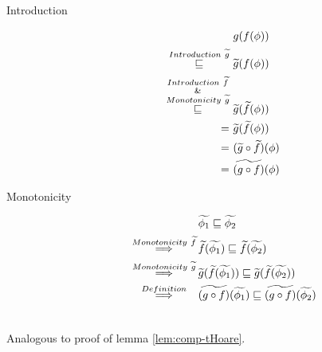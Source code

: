 \begin{proofatend}
    \begin{description}
        \item[Introduction]
        \begin{align*}
        &g(f(\phi))\\
        \overset{Introduction~\widetilde{g}}{\sqsubseteq}~
        &\widetilde{g}(f(\phi))\\
        \overset{\substack{Introduction~\widetilde{f}\\\&\\Monotonicity~\widetilde{g}}}{\sqsubseteq}~
        &\widetilde{g}(\widetilde{f}(\phi))\\
        =~
        &\widetilde{g}(\widetilde{f}(\phi))\\
        =~
        &(\widetilde{g} \circ \widetilde{f})(\phi)\\
        =~
        &\widetilde{(g \circ f)}(\phi)
        \end{align*}
        
        \item[Monotonicity]
        \begin{align*}
        &\widetilde{\phi_1} \sqsubseteq \widetilde{\phi_2}\\
        \overset{Monotonicity~\widetilde{f}}{\quad\quad\implies\quad\quad}
        &\widetilde{f}(\widetilde{\phi_1}) \sqsubseteq \widetilde{f}(\widetilde{\phi_2})\\
        \overset{Monotonicity~\widetilde{g}}{\quad\quad\implies\quad\quad}
        &\widetilde{g}(\widetilde{f}(\widetilde{\phi_1})) \sqsubseteq \widetilde{g}(\widetilde{f}(\widetilde{\phi_2}))\\
        \overset{Definition}{\quad\quad\implies\quad\quad}
        &\widetilde{(g \circ f)}(\widetilde{\phi_1}) \sqsubseteq \widetilde{(g \circ f)}(\widetilde{\phi_2})
        \end{align*}
    \end{description}
\end{proofatend}

\begin{proofatend}~\\
    Analogous to proof of lemma \ref{lem:comp-tHoare}.
\end{proofatend}

